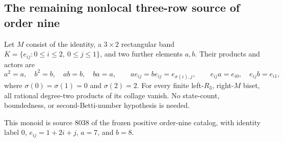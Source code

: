 \subsection{The remaining nonlocal three-row source of order nine}

\begin{theorem}
\label{CP2:A-nine-source8038-all-states}
Let $M$ consist of the identity, a $3\times2$ rectangular band
$K=\{e_{ij}:0\le i\le2,\ 0\le j\le1\}$, and two further
elements $a,b$.  Their products and actors are
\[
 a^2=a,\quad b^2=b,\quad ab=b,\quad ba=a,
 \qquad
 ae_{ij}=be_{ij}=e_{\sigma(i),j},
 \qquad
 e_{ij}a=e_{i0},\quad e_{ij}b=e_{i1},
\]
where $\sigma(0)=\sigma(1)=0$ and $\sigma(2)=2$.
For every finite left-$R_3$, right-$M$ biset, all rational
degree-two products of its collage vanish.  No state-count,
boundedness, or second-Betti-number hypothesis is needed.

This monoid is source $8038$ of the frozen positive order-nine
catalog, with identity label $0$, $e_{ij}=1+2i+j$, $a=7$, and $b=8$.
\end{theorem}
